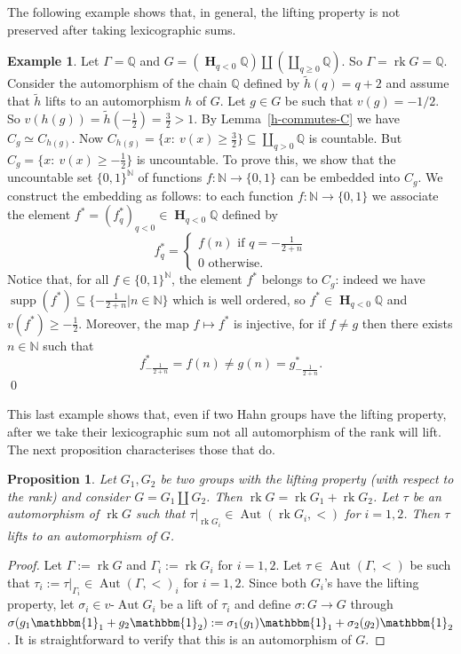 \documentclass[12pt,a4paper,reqno,openright]{amsart}
\newcommand{\N}{\mathbb N}
\newcommand{\Q}{\mathbb Q}
\newcommand{\ra}{\rightarrow}
\renewcommand{\1}{\mathbbm{1}}
\newcommand{\G}{\Gamma}
\DeclareMathOperator{\rk}{rk}
\DeclareMathOperator{\Aut}{Aut}
\newcommand{\vAut}{v\text{-}\Aut}
\DeclareMathOperator*\HH{\mathbf{H}}
\DeclareMathOperator*\supp{supp}
\theoremstyle{definition}
\theoremstyle{plain}
\theoremstyle{plain}
\theoremstyle{plain}
\newtheorem{prop}[defn]{Proposition}
\theoremstyle{plain}
\theoremstyle{plain}
\theoremstyle{plain}
\theoremstyle{plain}
\theoremstyle{plain}
\theoremstyle{definition}
\newtheorem{es}[defn]{Example}
\theoremstyle{definition}
\theoremstyle{plain}
\theoremstyle{definition}
\theoremstyle{definition}
\theoremstyle{plain}
\theoremstyle{plain}
\theoremstyle{plain}
\begin{document}
The following example shows that, in general, the lifting property is not preserved after taking lexicographic sums. 
\begin{es}\label{es:lifting-not-preserved-lex-sums}
	Let $\Gamma = \Q$ and $G = (\HH_{q<0}\Q) \amalg (\coprod_{q\geq0}\Q)$. So $\Gamma = \rk G = \Q$. Consider the automorphism of the chain $\Q$ defined by $\tilde h (q)= q+2$ and assume that $\tilde h$ lifts to an automorphism $h$ of $G$. Let $g\in G$ be such that $v(g) = -1/2$. So $v(h(g)) = \tilde h(-\frac{1}{2})=\frac{3}{2}>1$. By Lemma~\ref{h-commutes-C} we have $C_g \simeq C_{h(g)}$.  Now $C_{h(g)} = \{x:\ v(x) \geq \frac{3}{2}\}\subseteq\coprod_{q>0}\Q$ is countable. But 
	$C_g = \{x:\ v(x)\geq -\frac{1}{2}\}$ is uncountable. To prove this, we show that
	the uncountable set $\{0,1\}^\N$ of functions $f:\N\ra\{0,1\}$ can be embedded
	into $C_g$. We construct the embedding as follows: to each function $f:\N\ra\{0,1\}$
	we associate the element $f^* = (f^*_q)_{q<0}\in\HH_{q<0}\Q$ defined by
	$$
	f^*_q =
	\begin{cases}
	f(n) \text{ if } q = -\frac{1}{2+n}\\
	0 \text{ otherwise.}
	\end{cases}
	$$
	Notice that, for all $f\in \{0,1\}^\N$, the element $f^*$ belongs to $C_g$: indeed
	we have $\supp (f^*) \subseteq \{-\frac{1}{2+n}|n\in\N\}$ which is well ordered,
	so $f^*\in\HH_{q<0}\Q$ and $v(f^*)\geq -\frac{1}{2}$. Moreover,
	the map $f\mapsto f^*$ is injective, for if $f\neq g$ then there exists $n\in\N$ such
	that $$f^*_{-\frac{1}{2+n}} = f(n)\neq g(n) = g^*_{-\frac{1}{2+n}}.$$\qed
\end{es}

This last example shows that, even if two Hahn groups have the lifting property, after we take their lexicographic sum not all automorphism of the rank will lift. The next proposition characterises those that do.

\begin{prop}\label{prop:condition-lifting-preserved-lex}
	Let $G_1,G_2$ be two groups with the lifting property (with respect to the rank) and consider $G =G_1\amalg G_2$. Then $\rk G=\rk G_1 + \rk G_2$. Let $\tau$ be an automorphism of $\rk G$ such that $\tau|_{\rk G_i}\in\Aut(\rk G_i,<) $ for $i=1,2$.
	Then $\tau$ lifts to an automorphism of $G$.
\end{prop}
\begin{proof}
	Let $ \Gamma:= \rk G $ and $ \Gamma_i :=\rk G_i $ for $ i=1,2 $. Let $ \tau \in\Aut(\G, <) $ be such that $ \tau_i :=\tau|_{\Gamma_i}\in \Aut(\G, <)_i $ for $ i=1,2 $. Since both $ G_i $'s have the lifting property, let $ \sigma_i\in\vAut G_i $ be a lift of $ \tau_i $ and define $ \sigma\colon G\ra G $ through $ \sigma(g_1\1_1 + g_2\1_2):=\sigma_1(g_1)\1_1+\sigma_2(g_2)\1_2 $. It is straightforward to verify that this is an automorphism of $ G $.
\end{proof}
\end{document}
